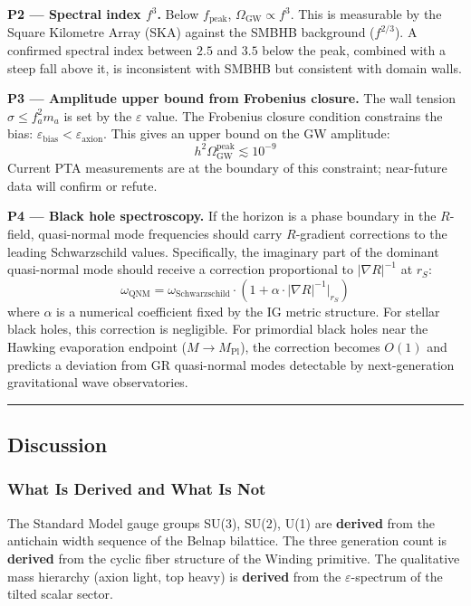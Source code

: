 \documentclass[12pt,a4paper]{article}
\begin{document}
\textbf{P2 --- Spectral index \(f^3\).} Below \(f_\text{peak}\),
\(\Omega_\text{GW} \propto f^3\). This is measurable by the Square
Kilometre Array (SKA) against the SMBHB background (\(f^{2/3}\)). A
confirmed spectral index between \(2.5\) and \(3.5\) below the peak,
combined with a steep fall above it, is inconsistent with SMBHB but
consistent with domain walls.

\textbf{P3 --- Amplitude upper bound from Frobenius closure.} The wall
tension \(\sigma \le f_a^2 m_a\) is set by the \(\varepsilon\) value.
The Frobenius closure condition constrains the bias:
\(\varepsilon_\text{bias} < \varepsilon_\text{axion}\). This gives an
upper bound on the GW amplitude:
\[h^2 \Omega_\text{GW}^\text{peak} \lesssim 10^{-9}\] Current PTA
measurements are at the boundary of this constraint; near-future data
will confirm or refute.

\textbf{P4 --- Black hole spectroscopy.} If the horizon is a phase
boundary in the \(R\)-field, quasi-normal mode frequencies should carry
\(R\)-gradient corrections to the leading Schwarzschild values.
Specifically, the imaginary part of the dominant quasi-normal mode
should receive a correction proportional to \(|\nabla R|^{-1}\) at
\(r_S\):
\[\omega_\text{QNM} = \omega_\text{Schwarzschild} \cdot \left(1 + \alpha \cdot |\nabla R|^{-1} \Big|_{r_S}\right)\]
where \(\alpha\) is a numerical coefficient fixed by the IG metric
structure. For stellar black holes, this correction is negligible. For
primordial black holes near the Hawking evaporation endpoint
(\(M \to M_\text{Pl}\)), the correction becomes \(O(1)\) and predicts a
deviation from GR quasi-normal modes detectable by next-generation
gravitational wave observatories.

\begin{center}\rule{0.5\linewidth}{0.5pt}\end{center}

\hypertarget{discussion}{%
\subsection{Discussion}\label{discussion}}

\hypertarget{what-is-derived-and-what-is-not}{%
\subsubsection{What Is Derived and What Is
Not}\label{what-is-derived-and-what-is-not}}

The Standard Model gauge groups SU(3), SU(2), U(1) are \textbf{derived}
from the antichain width sequence of the Belnap bilattice. The three
generation count is \textbf{derived} from the cyclic fiber structure of
the Winding primitive. The qualitative mass hierarchy (axion light, top
heavy) is \textbf{derived} from the \(\varepsilon\)-spectrum of the
tilted scalar sector.
\end{document}
